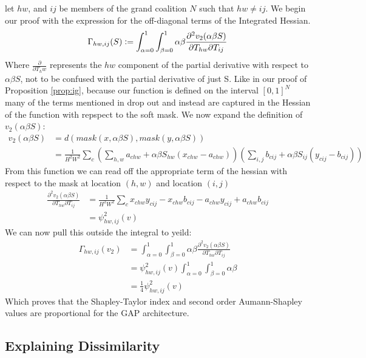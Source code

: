 \documentclass{article} %
\newcommand{\defeq}{\vcentcolon=}
\begin{document}
let $hw$, and $ij$ be members of the grand coalition $N$ such that $hw \neq ij$. We begin our proof with the expression for the off-diagonal terms of the Integrated Hessian. 
\begin{equation}
    \Gamma_{hw,ij}(S) \defeq  \int_{\alpha = 0}^1 \int_{\beta = 0}^1 \alpha \beta \frac{\partial^2 v_2(\alpha\beta S)}{\partial T_{hw} \partial T_{ij}}
\end{equation}
Where $\frac{\partial}{\partial T_hw}$ represents the $hw$ component of the partial derivative with respect to $\alpha\beta S$, not to be confused with the partial derivative of just S. Like in our proof of Proposition \ref{prop:ig}, because our function is defined on the interval $[0,1]^N$ many of the terms mentioned in \cite{integrated-hessians} drop out and instead are captured in the Hessian of the function with repspect to the soft mask. We now expand the definition of $v_2(\alpha\beta S)$:
\begin{align*}
    v_2(\alpha\beta S) &= d(mask(x, \alpha\beta S), mask(y, \alpha\beta S)) \\
    &= \frac{1}{H^2W^2} \sum_c \left( \sum_{h,w} a_{chw}  + \alpha\beta S_{hw} (x_{chw}-a_{chw})\right) \left( \sum_{i,j} b_{cij}  + \alpha\beta S_{ij}(y_{cij}-b_{cij}) \right)
\end{align*}
From this function we can read off the appropriate term of the hessian with respect to the mask at location $(h,w)$ and location $(i,j)$
\begin{align*}
    \frac{\partial^2 v_2(\alpha\beta S)}{\partial T_{hw} \partial T_{ij}} &= \frac{1}{H^2W^2} \sum_c x_{chw}y_{cij} - x_{chw}b_{cij} - a_{chw}y_{cij} + a_{chw}b_{cij} \\
    &= \psi_{hw,ij}^2(v) 
\end{align*}
We can now pull this outside the integral to yeild:
\begin{align*}
    \Gamma_{hw,ij}(v_2) &= \int_{\alpha = 0}^1 \int_{\beta = 0}^1 \alpha \beta \frac{\partial^2 v_2(\alpha\beta S)}{\partial T_{hw} \partial T_{ij}} \\
         &=\psi_{hw,ij}^2(v)  \int_{\alpha = 0}^1 \int_{\beta = 0}^1 \alpha \beta \\
          &=\frac{1}{4} \psi_{hw,ij}^2(v)  
\end{align*}
Which proves that the Shapley-Taylor index and second order Aumann-Shapley values are proportional for the GAP architecture. 



\subsection{Explaining Dissimilarity}
\end{document}
